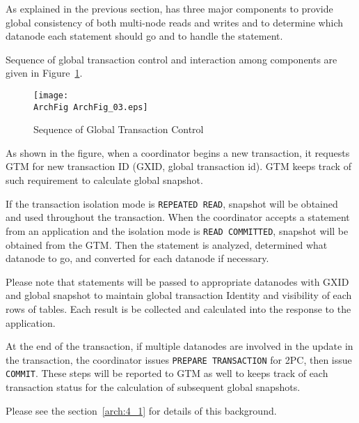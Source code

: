 

  As explained in the previous section, \XC{} has three major components to provide
  global consistency of both multi-node reads and writes and to determine which datanode each
  statement should go and to handle the statement.
  
  Sequence of global transaction control and interaction among \XC{} components are
  given in Figure~\ref{archfig:10}.
  
  \begin{figure}[htp]
	  \begin{center}
		  \texttt{[image: \\ArchFig ArchFig\_03.eps]}
		  \caption{\label{archfig:10}Sequence of Global Transaction Control}
	  \end{center}
  \end{figure}
  
  As shown in the figure, when a coordinator begins a new transaction, it requests GTM
  for new transaction ID (GXID, global transaction id).
  GTM keeps track of such requirement to calculate global snapshot.
  
  If the transaction isolation mode is \texttt{REPEATED READ}, snapshot will be obtained and
  used throughout the transaction.
  When the coordinator accepts a statement from an application and the isolation mode is
  \texttt{READ COMMITTED}, snapshot will be obtained from the GTM.
  Then the statement is analyzed, determined what datanode to go, and converted for
  each datanode if necessary.
  
  Please note that statements will be passed to appropriate datanodes with GXID
  and global snapshot to maintain global transaction Identity and visibility of
  each rows of tables.
  Each result is be collected and calculated into the response to the application.
  
  At the end of the transaction, if multiple datanodes are involved in the update in
  the transaction, the coordinator issues \texttt{PREPARE TRANSACTION} for 2PC, then issue
  \texttt{COMMIT}.
  These steps will be reported to GTM as well to keeps track of each transaction
  status for the calculation of subsequent global snapshots.
  
  Please see the section~\ref{arch:4_1} for details of this background.



